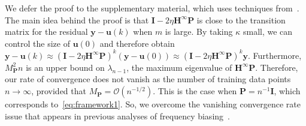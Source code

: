 \documentclass{article} %
\begin{document}
We defer the proof to the supplementary material, which uses techniques from~\citep{suyang}. The main idea behind the proof is that $\mathbf{I} - 2\eta \mathbf{H}^\infty\mathbf{P}$ is close to the transition matrix for the residual $\mathbf{y} - \mathbf{u}(k)$ when $m$ is large. By taking $\kappa$ small, we can control the size of $\mathbf{u}(0)$ and therefore obtain $\mathbf{y} - \mathbf{u}(k) \approx (\mathbf{I} - 2\eta \mathbf{H}^\infty\mathbf{P})^k (\mathbf{y} - \mathbf{u}(0)) \approx (\mathbf{I} - 2\eta \mathbf{H}^\infty\mathbf{P})^k \mathbf{y}$. Furthermore, $M_{\mathbf{P}}^2 n$ is an upper bound on $\lambda_{n-1}$, the maximum eigenvalue of $\mathbf{H}^\infty\mathbf{P}$. Therefore, our rate of convergence does not vanish as the number of training data points $n\rightarrow\infty$, provided that $M_{\mathbf{P}} = \mathcal{O}(n^{-1/2})$. This is the case when $\mathbf{P} = n^{-1}\mathbf{I}$, which corresponds to~\cref{eq:framework1}. So, we overcome the vanishing convergence rate issue that appears in previous analyses of frequency biasing~\citep{arora,basri}. 
\end{document}
